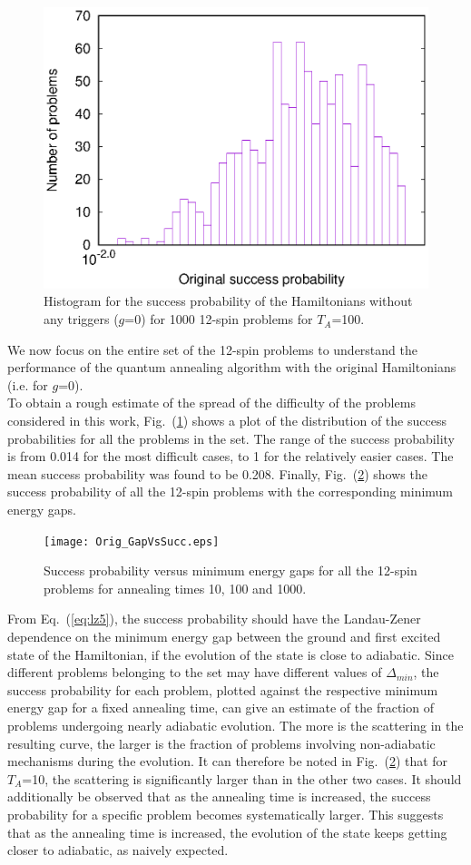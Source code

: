 \documentclass[../main.tex]{subfiles}
\begin{document}
\begin{figure}[H]
\centering 
\includegraphics[scale=0.8]{O_s12_T100_g0.eps}
\caption{Histogram for the success probability of the Hamiltonians without any triggers ($g$=0) for 1000 12-spin problems for $T_A$=100.}
\label{fig:o8}
\end{figure}
We now focus on the entire set of the 12-spin problems to understand the performance of the quantum annealing algorithm with the original Hamiltonians (i.e. for $g$=0).\\
To obtain a rough estimate of the spread of the difficulty of the problems considered in this work, Fig.~(\ref{fig:o8}) shows a plot of the distribution of the success probabilities for all the problems in the set. The range of the success probability is from 0.014 for the most difficult cases, to 1 for the relatively easier cases. The mean success probability was found to be 0.208. 
Finally, Fig.~(\ref{fig:o10}) shows the success probability of all the 12-spin problems with the corresponding minimum energy gaps.
\begin{figure}[H]
\centering 
\texttt{[image: Orig\_GapVsSucc.eps]}
\caption{Success probability versus minimum energy gaps for all the 12-spin problems for annealing times 10, 100 and 1000.}
\label{fig:o10}
\end{figure}
From Eq.~(\ref{eq:lz5}), the success probability should have the Landau-Zener dependence on the minimum energy gap between the ground and first excited state of the Hamiltonian, if the evolution of the state is close to adiabatic. Since different problems belonging to the set may have different values of $\Delta_{min}$, the success probability for each problem, plotted against the respective minimum energy gap for a fixed annealing time, can give an estimate of the fraction of problems undergoing nearly adiabatic evolution. The more is the scattering in the resulting curve, the larger is the fraction of problems involving non-adiabatic mechanisms during the evolution. It can therefore be noted in Fig.~(\ref{fig:o10}) that for $T_A$=10, the scattering is significantly larger than in the other two cases. It should additionally be observed that as the annealing time is increased, the success probability for a specific problem becomes systematically larger. This suggests that as the annealing time is increased, the evolution of the state keeps getting closer to adiabatic, as naively expected.
\end{document}
